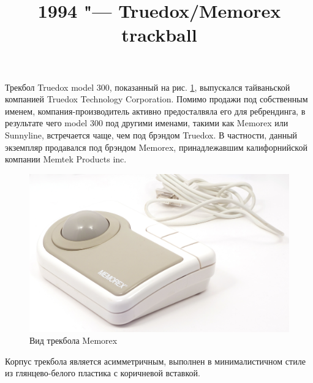 \documentclass[11pt, a4paper]{article}
\begin{document}
\title{1994 "--- Truedox/Memorex trackball}
\date{}
\maketitle
{}
Трекбол Truedox model 300, показанный на рис. \ref{fig:MemorexPic}, выпускался тайваньской компанией Truedox Technology Corporation. Помимо продажи под собственным именем, компания-производитель активно предосталвяла его для ребрендинга, в результате чего model 300 под другими именами, такими как Memorex или Sunnyline, встречается чаще, чем под брэндом Truedox. В частности, данный экземпляр продавался под брэндом Memorex, принадлежавшим калифорнийской компании Memtek Products inc.

\begin{figure}[h]
    \centering
    \includegraphics[scale=0.5]{1994_memorex_trackball/pic_30.jpg}
    \caption{Вид трекбола Memorex}
    \label{fig:MemorexPic}
\end{figure}

Корпус трекбола является асимметричным, выполнен в минималистичном стиле из глянцево-белого пластика с коричневой вставкой.
\end{document}
